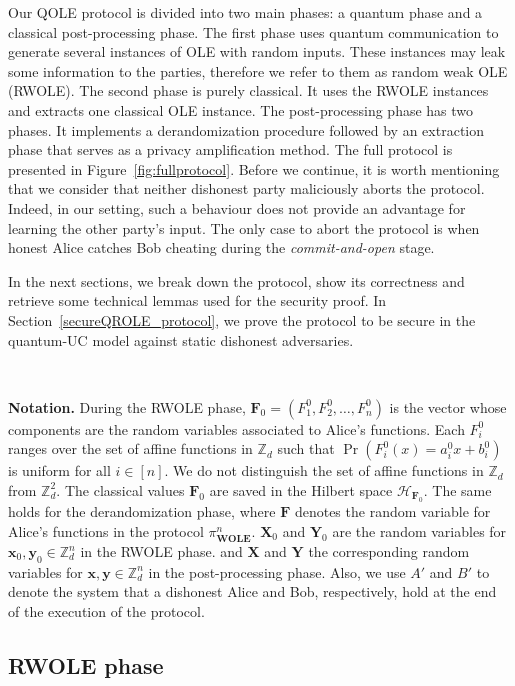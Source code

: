 Our QOLE protocol is divided into two main phases: a quantum phase and a classical post-processing phase. The first phase uses quantum communication to generate several instances of OLE with random inputs. These instances may leak some information to the parties, therefore we refer to them as random weak OLE (RWOLE). The second phase is purely classical. It uses the RWOLE instances and extracts one classical OLE instance. The post-processing phase has two phases. It implements a derandomization procedure followed by an extraction phase that serves as a privacy amplification method. The full protocol is presented in Figure~\ref{fig:fullprotocol}.  Before we continue, it is worth mentioning that we consider that neither dishonest party maliciously aborts the protocol. Indeed, in our setting, such a behaviour does not provide an advantage for learning the other party's input. The only case to abort the protocol is when honest Alice catches Bob cheating during the \textit{commit-and-open} stage.  

In the next sections, we break down the protocol, show its correctness and retrieve some technical lemmas used for the security proof. In Section~\ref{secureQROLE_protocol}, we prove the protocol to be secure in the quantum-UC model against static dishonest adversaries.

\

\noindent\textbf{Notation.}  During the RWOLE phase, $\mathbf{F}_0 = (F^0_1,F^0_2 ,\ldots, F^0_n)$ is the vector whose components are the  random variables associated to Alice's functions. Each  $F^0_i$ ranges over the set of affine functions in $\mathbb{Z}_d$ such that $\Pr(F^0_i(x)=a^0_ix+ b^0_i)$ is uniform for all $i\in [n]$. We do not distinguish the set of affine functions in $\mathbb{Z}_d$ from $\mathbb{Z}_d^2$. The classical values $\mathbf{F}_0$ are saved in the Hilbert space $\mathcal{H}_{\mathbf{F}_0}$. The same holds for the derandomization phase, where $\mathbf{F}$ denotes the random variable for Alice's functions in the protocol $\pi^n_{\textbf{WOLE}}$. $\textbf{X}_0$ and $\textbf{Y}_0$ are the random variables for $\textbf{x}_0, \textbf{y}_0 \in \mathbb{Z}^{ n}_d$  in the RWOLE phase. and $\textbf{X}$ and $\textbf{Y}$ the corresponding random variables for $\textbf{x}, \textbf{y} \in \mathbb{Z}^{n}_d$  in the post-processing phase. Also, we use $A'$ and $B'$ to denote the system that a dishonest Alice and Bob, respectively, hold at the end of the execution of the protocol.


\subsection{RWOLE phase}

